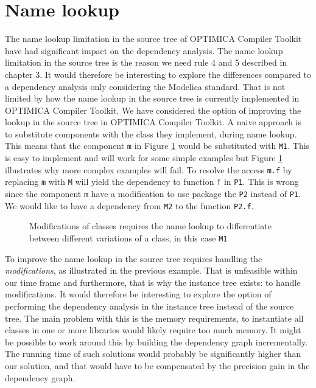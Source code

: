 \documentclass{cslthse-msc}
\begin{document}
\section{Name lookup}
The name lookup limitation in the source tree of OPTIMICA Compiler Toolkit have had significant impact on the dependency analysis. The name lookup limitation in the source tree is the reason we need rule 4 and 5 described in chapter 3. It would therefore be interesting to explore the differences compared to a dependency analysis only considering the Modelica standard. That is not limited by how the name lookup in the source tree is currently implemented in OPTIMICA Compiler Toolkit. We have considered the option of improving the lookup in the source tree in OPTIMICA Compiler Toolkit. A naive approach is to substitute components with the class they implement, during name lookup. This means that the component \texttt{m} in Figure \ref{fig:betterLookup} would be substituted with \texttt{M1}. This is easy to implement and will work for some simple examples but Figure \ref{fig:betterLookup} illustrates why more complex examples will fail. To resolve the access \texttt{m.f} by replacing \texttt{m} with \texttt{M} will yield the dependency to function \texttt{f} in \texttt{P1}. This is wrong since the component \texttt{m} have a modification to use package the \texttt{P2} instead of \texttt{P1}. We would like to have a dependency from \texttt{M2} to the function \texttt{P2.f}.

\begin{figure}[htbp]
    \centering
    \raisebox{4.0 cm}{}
    \caption{Modifications of classes requires the name lookup to differentiate between different variations of a class, in this case \texttt{M1}}
    \label{fig:betterLookup}
\end{figure}

To improve the name lookup in the source tree requires handling the \emph{modifications}, as illustrated in the previous example. That is unfeasible within our time frame and furthermore, that is why the instance tree exists: to handle modifications. It would therefore be interesting to explore the option of performing the dependency analysis in the instance tree instead of the source tree. The main problem with this is the memory requirements, to instantiate all classes in one or more libraries would likely require too much memory. It might be possible to work around this by building the dependency graph incrementally. The running time of such solutions would probably be significantly higher than our solution, and that would have to be compensated by the precision gain in the dependency graph. 
\end{document}
